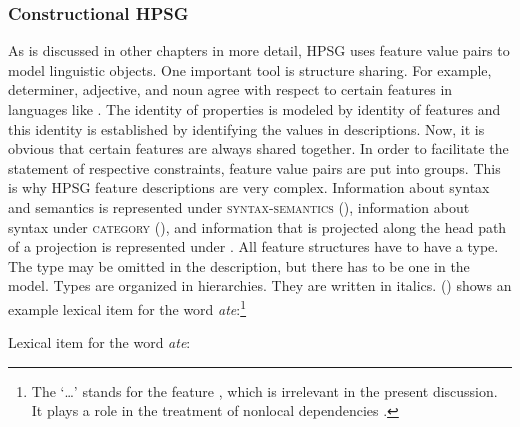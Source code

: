 \documentclass[output=paper
	        ,collection
	        ,collectionchapter
 	        ,biblatex
                ,babelshorthands
                ,newtxmath
                ,draftmode
                ,colorlinks, citecolor=brown
]{langscibook}
\begin{document}

\subsubsection{Constructional HPSG}
\label{sec-constructional-hpsg}

As is discussed in other chapters in more detail, HPSG uses feature value pairs to model linguistic
objects. One important tool is structure sharing. For example, determiner, adjective, and noun agree
with respect to certain features in languages like . The identity of properties is modeled by
identity of features and this identity is established by identifying the values in descriptions. Now,
it is obvious that certain features are always shared together. In order to facilitate the statement
of respective constraints, feature value pairs are put into groups. This is why HPSG feature
descriptions are very complex. Information about syntax and semantics is represented under
\textsc{syntax-semantics} (\synsem), information about syntax under \textsc{category} (\cat), and
information that is projected along the head path of a projection is represented under \head. All
feature structures have to have a type. The type may be omitted in the description, but there has to
be one in the model. Types are organized in hierarchies. They are written in italics. ()
shows an example lexical item for the word \emph{ate}:\footnote{
  The `\ldots' stands for the feature \local, which is irrelevant in the present discussion. It plays
  a role in the treatment of nonlocal dependencies .
}

\eas
\label{le-ate}
Lexical item for the word \emph{ate}:\\
\end{document}
